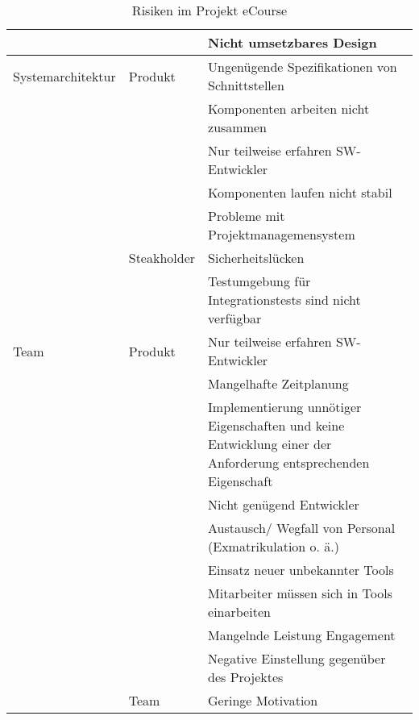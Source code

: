 \begin{table}
\begin{tabularx}{\textwidth}{|l|l|X|}
\hline
 &  & Nicht umsetzbares Design  \\ 
\hline
Systemarchitektur & Produkt & Ungenügende Spezifikationen von Schnittstellen  \\ 
\hline
 &  & Komponenten arbeiten nicht zusammen\\ 
\hline
 &  & Nur teilweise erfahren SW-Entwickler  \\ 
\hline
 &  & Komponenten laufen nicht stabil  \\ 
\hline
 &  & Probleme mit Projektmanagemensystem \\ 
\hline
 & Steakholder & Sicherheitslücken\\ 
\hline
 &  & Testumgebung für Integrationstests sind nicht verfügbar  \\ 
\hline
Team & Produkt & Nur teilweise erfahren SW-Entwickler  \\ 
\hline
 &  & Mangelhafte Zeitplanung   \\ 
\hline
 &  & Implementierung unnötiger Eigenschaften und keine Entwicklung einer der Anforderung entsprechenden Eigenschaft  \\ 
\hline
 &  & Nicht genügend Entwickler  \\ 
\hline
 &  & Austausch/ Wegfall von Personal (Exmatrikulation o. ä.)   \\ 
\hline
 &  & Einsatz neuer unbekannter Tools  \\ 
\hline
 &  & Mitarbeiter müssen sich in Tools einarbeiten  \\ 
\hline
 &  & Mangelnde Leistung Engagement  \\ 
\hline
 &  & Negative Einstellung gegenüber des Projektes  \\ 
\hline
 & Team & Geringe Motivation\\ 
\hline
\end{tabularx}
\caption{Risiken im Projekt eCourse}
\label{tab:Risiken}
\end{table}